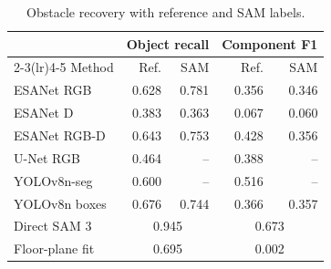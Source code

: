 \begin{table}[!t]
\caption{Obstacle recovery with reference and SAM labels.}
\label{tab:shared-detection}
\centering\footnotesize
\setlength{\tabcolsep}{4pt}
\begin{tabular}{lrrrr}
\toprule
 & \multicolumn{2}{c}{Object recall} & \multicolumn{2}{c}{Component F1}\\
\cmidrule(lr){2-3}\cmidrule(lr){4-5}
Method & Ref. & SAM & Ref. & SAM\\
\midrule
ESANet RGB & 0.628 & 0.781 & 0.356 & 0.346\\
ESANet D & 0.383 & 0.363 & 0.067 & 0.060\\
ESANet RGB-D & 0.643 & 0.753 & 0.428 & 0.356\\
U-Net RGB & 0.464 & -- & 0.388 & --\\
YOLOv8n-seg & 0.600 & -- & 0.516 & --\\
YOLOv8n boxes & 0.676 & 0.744 & 0.366 & 0.357\\
\midrule
Direct SAM 3 & \multicolumn{2}{c}{0.945} & \multicolumn{2}{c}{0.673}\\
Floor-plane fit & \multicolumn{2}{c}{0.695} & \multicolumn{2}{c}{0.002}\\
\bottomrule
\end{tabular}\par{}
\end{table}
